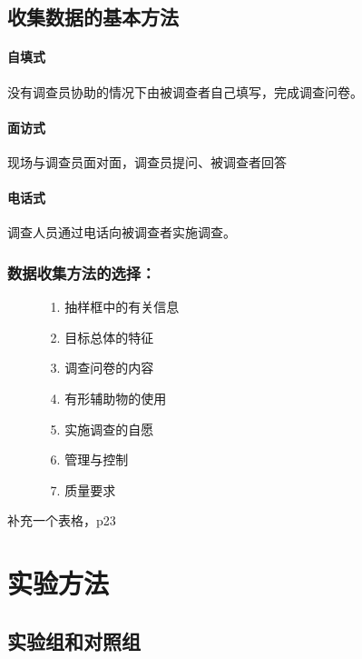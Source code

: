 \documentclass[UTF8,10pt]{book}
\begin{document}
    \subsection{收集数据的基本方法}

    \paragraph{自填式}

    没有调查员协助的情况下由被调查者自己填写，完成调查问卷。

    \paragraph{面访式}

    现场与调查员面对面，调查员提问、被调查者回答

    \paragraph{电话式}

    调查人员通过电话向被调查者实施调查。

    \subsubsection{数据收集方法的选择：}
    \begin{itemize}
		\item [] {
			\begin{enumerate}
				\item [1.] 抽样框中的有关信息
				\item [2.] 目标总体的特征
				\item [3.] 调查问卷的内容
				\item [4.] 有形辅助物的使用
				\item [5.] 实施调查的自愿
				\item [6.] 管理与控制
				\item [7.] 质量要求
			\end{enumerate}
		}
    \end{itemize}

    {\kaishu 补充一个表格，p23}

    \section{实验方法}
    \subsection{实验组和对照组}
\end{document}
